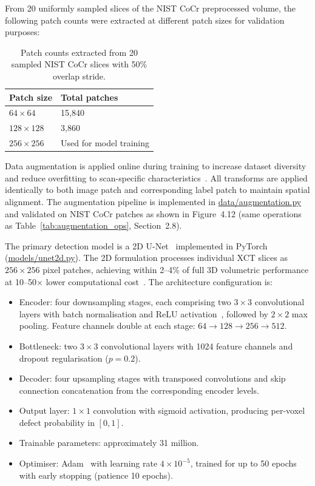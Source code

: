 From 20 uniformly sampled slices of the NIST CoCr preprocessed volume, the following patch counts
were extracted at different patch sizes for validation purposes:

\begin{table}[htbp]
\centering
\caption{Patch counts extracted from 20 sampled NIST CoCr slices with 50\% overlap stride.}
\label{tab:patch_counts}
\begin{tabular}{ll}
\toprule
\textbf{Patch size} & \textbf{Total patches} \\
\midrule
$64 \times 64$ & 15,840 \\
$128 \times 128$ & 3,860 \\
$256 \times 256$ & Used for model training \\
\bottomrule
\end{tabular}
\end{table}

Data augmentation is applied online during training to increase dataset diversity and reduce
overfitting to scan-specific characteristics~\citep{Bellens2021}. All transforms are applied
identically to both image patch and corresponding label patch to maintain spatial alignment. The
augmentation pipeline is implemented in \url{data/augmentation.py} and validated on NIST CoCr
patches as shown in Figure~4.12 (same operations as Table~\ref{tab:augmentation_ops}, Section~2.8).

The primary detection model is a 2D U-Net~\citep{Ronneberger2015} implemented in
PyTorch~\citep{Paszke2019} (\url{models/unet2d.py}). The 2D formulation processes individual XCT
slices as $256 \times 256$ pixel patches, achieving within 2--4\% of full 3D volumetric performance
at 10--50$\times$ lower computational cost~\citep{Wong2021}. The architecture configuration is:
\begin{itemize}
\item Encoder: four downsampling stages, each comprising two $3\times3$ convolutional layers with
  batch normalisation and ReLU activation~\citep{Ronneberger2015}, followed by $2\times2$ max
  pooling. Feature channels double at each stage: $64 \to 128 \to 256 \to 512$.
\item Bottleneck: two $3\times3$ convolutional layers with 1024 feature channels and dropout
  regularisation ($p = 0.2$).
\item Decoder: four upsampling stages with transposed convolutions and skip connection
  concatenation from the corresponding encoder levels.
\item Output layer: $1\times1$ convolution with sigmoid activation, producing per-voxel defect
  probability in $[0, 1]$.
\item Trainable parameters: approximately 31 million.
\item Optimiser: Adam~\citep{Kingma2015} with learning rate $4\times10^{-5}$, trained for up to 50
  epochs with early stopping (patience 10 epochs).
\end{itemize}

